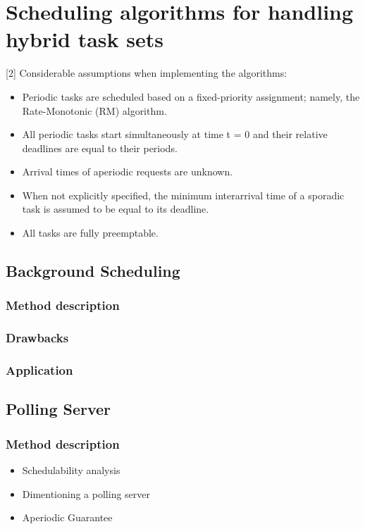 \documentclass[conference]{IEEEtran}
\begin{document}
\section{Scheduling algorithms for handling hybrid task sets}
[2] Considerable assumptions when implementing the algorithms:\\
\begin{itemize}
\item Periodic tasks are scheduled based on a fixed-priority assignment; namely, the Rate-Monotonic (RM) algorithm.\\
\item All periodic tasks start simultaneously at time t = 0 and their relative deadlines are equal to their periods.
\item Arrival times of aperiodic requests are unknown.\\
\item When not explicitly specified, the minimum interarrival time of a sporadic task is assumed to be equal to its deadline.\\
\item All tasks are fully preemptable.\\
\end{itemize}

\subsection{Background Scheduling}

\subsubsection{Method description}

\subsubsection{Drawbacks}

\subsubsection{Application}

\subsection{Polling Server}

\subsubsection{Method description}
\begin{itemize}
\item Schedulability analysis\\
\item Dimentioning a polling server\\
\item Aperiodic Guarantee\\
\end{itemize}
\end{document}
